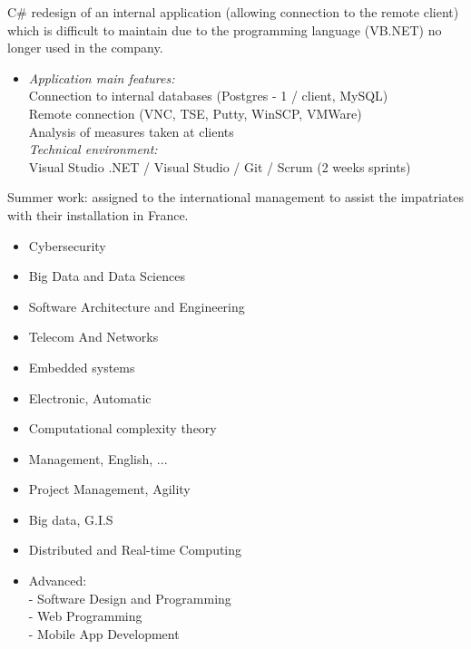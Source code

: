 \documentclass[10pt,a4paper]{altacv}
\begin{document}
\divider
{}
    C\# redesign of an internal application (allowing connection to the remote client) which is difficult to maintain due to the programming language (VB.NET) no longer used in the company. 
    \vspace{\baselineskip}

\begin{itemize}
\item \textit{Application main features:}\\
        Connection to internal databases (Postgres - 1 / client, MySQL)\\
        Remote connection (VNC, TSE, Putty, WinSCP, VMWare)\\
        Analysis of measures taken at clients\\
\vspace{\baselineskip}
\textit{Technical environment:}\\
        Visual Studio .NET / Visual Studio / Git / Scrum (2 weeks sprints)
\end{itemize}

\divider
{}
    Summer work: assigned to the international management to assist the impatriates with their installation in France.
\divider
\clearpage
{}

\begin{itemize}
\item Cybersecurity
\item Big Data and Data Sciences 
\item Software Architecture and Engineering 
\item Telecom And Networks
\item Embedded systems 
\item Electronic, Automatic
\item Computational complexity theory
\item Management, English, ...
\end{itemize}
\divider

\begin{itemize}
\item Project Management, Agility 
\item Big data, G.I.S 
\item Distributed and Real-time Computing
\item Advanced: \\
            -   Software Design and Programming\\
            -   Web Programming\\ 
            -   Mobile App Development\\
            \end{itemize}
\end{document}
